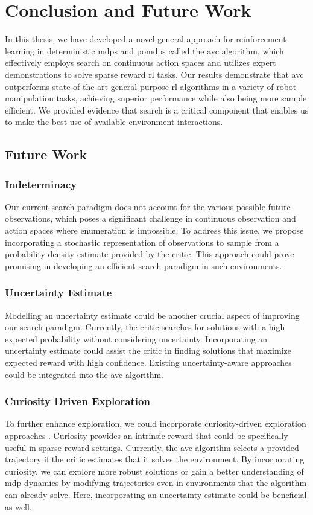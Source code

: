 
\chapter{Conclusion and Future Work}
\label{chapter:Conc_Fut}
In this thesis, we have developed a novel general approach for reinforcement learning in deterministic \ac{mdp}s and \ac{pomdp}s called the \ac{avc} algorithm, 
which effectively employs search on continuous action spaces and utilizes 
expert demonstrations to solve sparse reward \ac{rl} tasks. Our results demonstrate that \ac{avc} 
outperforms state-of-the-art general-purpose \ac{rl} algorithms in a variety of robot manipulation tasks, achieving superior performance 
while also being more sample efficient. We provided evidence that search is a critical component that enables us to make the best use of available 
environment interactions.

\section{Future Work}
\subsection{Indeterminacy}
Our current search paradigm does not account for the various possible future observations, which poses a significant challenge in 
continuous observation and action spaces where enumeration is impossible. To address this issue, we propose incorporating a stochastic 
representation of observations to sample from a probability density estimate provided by the critic. 
This approach could prove promising in developing an efficient search paradigm in such environments.

\subsection{Uncertainty Estimate}
Modelling an uncertainty estimate could be another crucial aspect of improving our search paradigm. 
Currently, the critic searches for solutions with a high expected probability without considering uncertainty. 
Incorporating an uncertainty estimate could assist the critic in finding solutions that maximize expected reward with high confidence. 
Existing uncertainty-aware approaches \cite{gawlikowski2022survey,liu2022simple} 
could be integrated into the \ac{avc} algorithm.

\subsection{Curiosity Driven Exploration}
To further enhance exploration, we could incorporate curiosity-driven exploration approaches \cite{pathak2017curiositydriven}. 
Curiosity provides an intrinsic reward that could be specifically useful in sparse reward settings. 
Currently, the \ac{avc} algorithm selects a provided trajectory if the critic estimates that it solves the environment. By incorporating curiosity, 
we can explore more robust solutions or gain a better understanding of \ac{mdp} dynamics by modifying trajectories even in environments that the 
algorithm can already solve. Here, incorporating an uncertainty estimate could be beneficial as well.